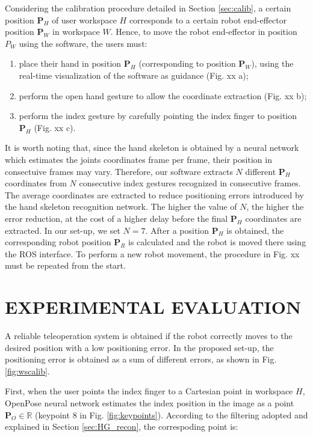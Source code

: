 \documentclass[a4paper, 10 pt, conference]{ieeeconf}      %
\begin{document}
Considering the calibration procedure detailed in Section \ref{sec:calib}, a certain position $\mathbf{P}_{H}$ of user workspace $H$ corresponds to a certain robot end-effector position $\mathbf{P}_{W}$ in workspace $W$. Hence, to move the robot end-effector in position $P_W$  using the software, the users must: %
\begin{enumerate}
\item place their hand in position $\mathbf{P}_H$ (corresponding to position $\mathbf{P}_W$), using the real-time visualization of the software as guidance (Fig. xx a);
\item perform the open hand gesture to allow the coordinate extraction (Fig. xx b);
\item perform the index gesture by carefully pointing the index finger to position $\mathbf{P}_H$ (Fig. xx c).
\end{enumerate}

It is worth noting that, since the hand skeleton is obtained by a neural network which estimates the joints coordinates frame per frame, their position in consectuive frames may vary. Therefore, our software extracts $N$ different $\mathbf{P}_H$ coordinates from $N$ consecutive index gestures recognized in consecutive frames. The average coordinates are extracted to reduce positioning errors introduced by the hand skeleton recognition network. The higher the value of $N$, the higher the error reduction, at the cost of a higher delay before the final $\mathbf{P}_H$ coordinates are extracted. In our set-up, we set $N = 7$.
After a position $\mathbf{P}_H$ is obtained, the corresponding robot position $\mathbf{P}_R$ is calculated and the robot is moved there using the ROS interface.
To perform a new robot movement, the procedure in Fig. xx must be repeated from the start. %

\section{EXPERIMENTAL EVALUATION}\label{sec:experiments}

A reliable teleoperation system is obtained if the robot correctly moves to the desired position with a low positioning error. In the proposed set-up, the positioning error is obtained as a sum of different errors, as shown in Fig. \ref{fig:wscalib}.

First, when the user points the index finger to a Cartesian point in workspace $H$, OpenPose neural network estimates the index position in the image as a point $\mathbf{P}_O \in \mathbb{R}$ (keypoint $8$ in Fig. \ref{fig:keypoints}). According to the filtering adopted and explained in Section \ref{sec:HG_recon}, the correspoding point is:
\end{document}
